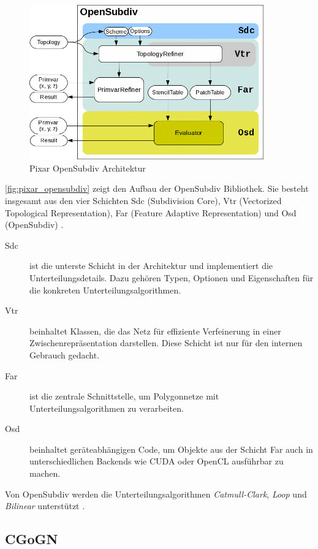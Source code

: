 \begin{figure}
  \centering
  \includegraphics[width=0.9\textwidth]{content/media/pixar_opensubdiv}
  \caption{Pixar OpenSubdiv Architektur \cite{Pixar.27.07.2015}}
  \label{fig:pixar_opensubdiv}
\end{figure}

\autoref{fig:pixar_opensubdiv} zeigt den Aufbau der OpenSubdiv Bibliothek.
Sie besteht insgesamt aus den vier Schichten Sdc (Subdivision Core), Vtr (Vectorized Topological Representation),
Far (Feature Adaptive Representation) und Osd (OpenSubdiv) \cite{Pixar.27.07.2015}.

\begin{description}
 \item[Sdc] ist die unterste Schicht in der Architektur und implementiert die Unterteilungsdetails.
 Dazu gehören Typen, Optionen und Eigenschaften für die konkreten Unterteilungsalgorithmen.
 \item[Vtr] beinhaltet Klassen, die das Netz für effiziente Verfeinerung in einer Zwischenrepräsentation darstellen.
 Diese Schicht ist nur für den internen Gebrauch gedacht.
 \item[Far] ist die zentrale Schnittstelle, um Polygonnetze mit Unterteilungsalgorithmen zu verarbeiten.
 \item[Osd] beinhaltet geräteabhängigen Code, um Objekte aus der Schicht Far auch in unterschiedlichen Backends wie
  CUDA oder OpenCL ausführbar zu machen.
\end{description}

Von OpenSubdiv werden die Unterteilungsalgorithmen \emph{Catmull-Clark}, \emph{Loop} und \emph{Bilinear} unterstützt \cite{Pixar.27.07.2015}. 

\subsection{CGoGN}

